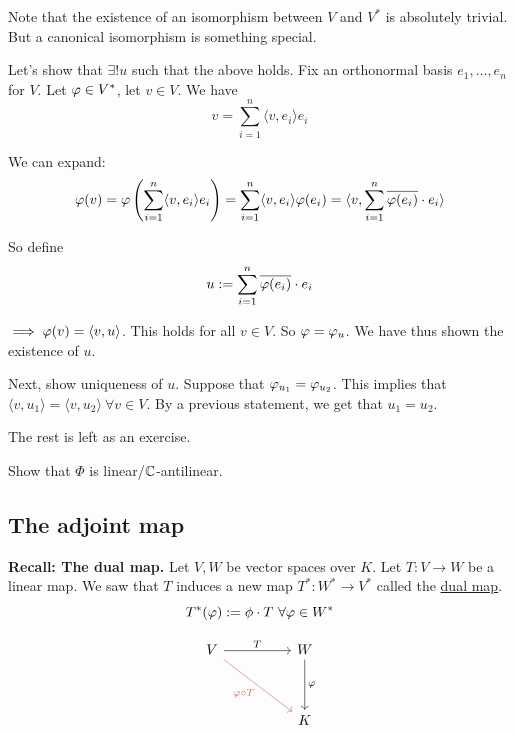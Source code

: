 \documentclass[12pt]{article}
\begin{document}
Note that the existence of an isomorphism between $V$ and $V^*$ is absolutely trivial. But a canonical isomorphism is something special.

\begin{proofbox}
    Let's show that $\exists! u$ such that the above holds. Fix an orthonormal basis $e_1,\dots,e_n$ for $V$. Let $\varphi \in V^*$, let $v \in V$. We have
    $$
        v = \sum_{i = 1}^{n} \langle v, e_i \rangle e_i
    $$

    We can expand:
    $$
        \varphi(v) = \varphi\left( \sum_{i = 1}^{n} \langle v, e_i \rangle e_i \right) = \sum_{i = 1}^{n} \langle v, e_i \rangle \varphi(e_i) = \langle v, \sum_{i = 1}^{n} \overline{\varphi(e_i)} \cdot e_i \rangle
    $$

    So define
    $$
        u := \sum_{i = 1}^{n} \overline{\varphi(e_i)} \cdot e_i
    $$

    $\implies \varphi(v) = \langle v, u \rangle$. This holds for all $v \in V$. So $\varphi = \varphi_u$. We have thus shown the existence of $u$.

    Next, show uniqueness of $u$. Suppose that $\varphi_{u_1} = \varphi_{u_2}$. This implies that $\langle v, u_1 \rangle = \langle v, u_2 \rangle \ \forall v \in V$. By a previous statement, we get that $u_1 = u_2$.

    The rest is left as an exercise.
\end{proofbox}

\begin{exercise}{}{}
    Show that $\Phi$ is linear/$\mathbb{C}$-antilinear.
\end{exercise}

\subsection{The adjoint map}

\textbf{Recall: The dual map.} Let $V, W$ be vector spaces over $K$. Let $T: V \rightarrow W$ be a linear map. We saw that $T$ induces a new map $T^*: W^* \rightarrow V^*$ called the \underline{dual map}.
$$
    T^*(\varphi) := \phi \cdot T \ \forall \varphi \in W^*
$$

\[\begin{tikzcd}
	V && W \\
	\\
	&& K
	\arrow["T", from=1-1, to=1-3]
	\arrow["{\varphi \circ T}"', color={rgb,255:red,214;green,92;blue,92}, from=1-1, to=3-3]
	\arrow["\varphi", from=1-3, to=3-3]
\end{tikzcd}\]
\end{document}
